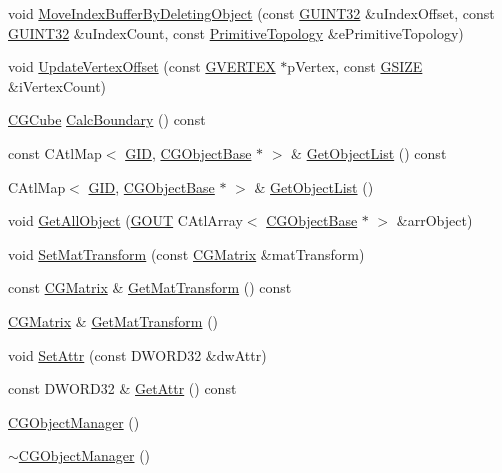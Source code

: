 \begin{DoxyCompactItemize}
\item 
void \hyperlink{class_c_g_object_manager_a79ea920be826a41db135be2e7f5f0e60}{Move\+Index\+Buffer\+By\+Deleting\+Object} (const \hyperlink{_g_types_8h_a2e1a1c77d1349057202e2f34e071019c}{G\+U\+I\+N\+T32} \&u\+Index\+Offset, const \hyperlink{_g_types_8h_a2e1a1c77d1349057202e2f34e071019c}{G\+U\+I\+N\+T32} \&u\+Index\+Count, const \hyperlink{_g_types_8h_a940e3da6a9b57aae3de0b050e2a7af5e}{Primitive\+Topology} \&e\+Primitive\+Topology)
\item 
void \hyperlink{class_c_g_object_manager_a69ba4e764882bc099418de02cfb493aa}{Update\+Vertex\+Offset} (const \hyperlink{struct_g_v_e_r_t_e_x}{G\+V\+E\+R\+T\+E\+X} $\ast$p\+Vertex, const \hyperlink{_g_types_8h_ac7dd75e8df268a0368c6cb433764fdcb}{G\+S\+I\+Z\+E} \&i\+Vertex\+Count)
\item 
\hyperlink{class_c_g_cube}{C\+G\+Cube} \hyperlink{class_c_g_object_manager_ad03bcee16cfe308e3e781ecdc5b20404}{Calc\+Boundary} () const 
\item 
const C\+Atl\+Map$<$ \hyperlink{_g_types_8h_a5b96ecb16d8e437977d12cd40aa6f6d8}{G\+I\+D}, \hyperlink{class_c_g_object_base}{C\+G\+Object\+Base} $\ast$ $>$ \& \hyperlink{class_c_g_object_manager_a7f9df575bdaea017d9fcc33690a500b3}{Get\+Object\+List} () const 
\item 
C\+Atl\+Map$<$ \hyperlink{_g_types_8h_a5b96ecb16d8e437977d12cd40aa6f6d8}{G\+I\+D}, \hyperlink{class_c_g_object_base}{C\+G\+Object\+Base} $\ast$ $>$ \& \hyperlink{class_c_g_object_manager_a64a2a3c21ada551d6ca93712efab3094}{Get\+Object\+List} ()
\item 
void \hyperlink{class_c_g_object_manager_a72ad01de30705286886f17479fbb5380}{Get\+All\+Object} (\hyperlink{_g_types_8h_a0858ec221262e635612871d70ca233ad}{G\+O\+U\+T} C\+Atl\+Array$<$ \hyperlink{class_c_g_object_base}{C\+G\+Object\+Base} $\ast$ $>$ \&arr\+Object)
\item 
void \hyperlink{class_c_g_object_manager_a7e3efe13a75bd4fe3c94a26a28e68eba}{Set\+Mat\+Transform} (const \hyperlink{class_c_g_matrix}{C\+G\+Matrix} \&mat\+Transform)
\item 
const \hyperlink{class_c_g_matrix}{C\+G\+Matrix} \& \hyperlink{class_c_g_object_manager_a5a54552ba028c732f0eeff69a1356a23}{Get\+Mat\+Transform} () const 
\item 
\hyperlink{class_c_g_matrix}{C\+G\+Matrix} \& \hyperlink{class_c_g_object_manager_afcacf6932c6885788f2cb7f67ca63dc0}{Get\+Mat\+Transform} ()
\item 
void \hyperlink{class_c_g_object_manager_a83df423f342a5e70c0463afa03889c91}{Set\+Attr} (const D\+W\+O\+R\+D32 \&dw\+Attr)
\item 
const D\+W\+O\+R\+D32 \& \hyperlink{class_c_g_object_manager_a1e7d91db786b73e3ccce29c14bf1edc4}{Get\+Attr} () const 
\item 
\hyperlink{class_c_g_object_manager_a8e1eb3b5a73ef8b1aea4fb1e7c380367}{C\+G\+Object\+Manager} ()
\item 
\hyperlink{class_c_g_object_manager_a18f3076244818aca39259b04c2bb9de9}{$\sim$\+C\+G\+Object\+Manager} ()
\end{DoxyCompactItemize}


